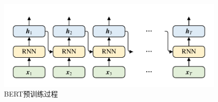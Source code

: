 \begin{figure}[htb]
	\centering
	\includegraphics[page=12, width=0.75\linewidth]{images/structure.pdf}
	\caption{BERT预训练过程}
	\label{fig:BERTPretraining}
\end{figure}